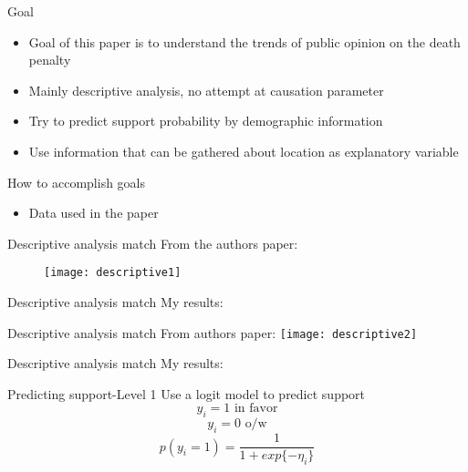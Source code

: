 \documentclass{beamer}
\title{}
\subtitle{Hierarchical models for estimating state and
	demographic trends in US death penalty public
	opinion}
\date{\today}
\begin{document}
	\begin{frame}
		\maketitle
	\end{frame}
	
	\begin{frame}{Goal}
		\begin{itemize}
			\item Goal of this paper is to understand the trends of public opinion on the death penalty
			\item Mainly descriptive analysis, no attempt at causation parameter
			\item Try to predict support probability by demographic information
			\item Use information that can be gathered about location as explanatory variable
		\end{itemize}
	\end{frame}
	
	\begin{frame}{How to accomplish goals}
		\begin{itemize}
			\item Data used in the paper
		\end{itemize}
	\end{frame}
	
	\begin{frame}{Descriptive analysis match}
		From the authors paper:
		\begin{figure}
			\centering
		\texttt{[image: descriptive1]}
		\end{figure}
	\end{frame}
	
	\begin{frame}{Descriptive analysis match}
		My results:
		
	\end{frame}
	
	\begin{frame}{Descriptive analysis match}
		From authors paper:
		\texttt{[image: descriptive2]}
	\end{frame}
	
	\begin{frame}{Descriptive analysis match}
		My results:
	\end{frame}
	
	\begin{frame}{Predicting support-Level 1}
		Use a logit model to predict support 
		\[ y_i = 1 \text{ in favor} \]
		\[  y_i = 0 \text{ o/w} \]
		\[ p(y_i = 1) = \frac{1}{1 + exp\{-\eta_i \}  } \]
	\end{frame}
	
\end{document}
